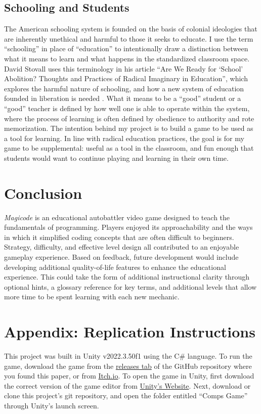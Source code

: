 \documentclass[10pt,twocolumn]{article}
\begin{document}
\subsection{Schooling and Students}
The American schooling system is founded on the basis of colonial ideologies that are inherently unethical and harmful to those it seeks to educate. I use the term “schooling” in place of “education” to intentionally draw a distinction between what it means to learn and what happens in the standardized classroom space. David Stovall uses this terminology in his article “Are We Ready for ‘School’ Abolition? Thoughts and Practices of Radical Imaginary in Education”, which explores the harmful nature of schooling, and how a new system of education founded in liberation is needed \cite{stovall-abolition}. What it means to be a “good” student or a “good” teacher is defined by how well one is able to operate within the system, where the process of learning is often defined by obedience to authority and rote memorization. The intention behind my project is to build a game to be used as a tool for learning. In line with radical education practices, the goal is for my game to be supplemental: useful as a tool in the classroom, and fun enough that students would want to continue playing and learning in their own time.


\section{Conclusion}
\textit{Magicode} is an educational autobattler video game designed to teach the fundamentals of programming. Players enjoyed its approachability and the ways in which it simplified coding concepts that are often difficult to beginners. Strategy, difficulty, and effective level design all contributed to an enjoyable gameplay experience. Based on feedback, future development would include developing additional quality-of-life features to enhance the educational experience. This could take the form of additional instructional clarity through optional hints, a glossary reference for key terms, and additional levels that allow more time to be spent learning with each new mechanic.

\appendix

\section{Appendix: Replication Instructions}
This project was built in Unity v2022.3.50f1 using the C\# language. To run the game, download the game from the \href{https://github.com/slevy14/Comps-Game/releases/tag/Release}{releases tab} of the GitHub repository where you found this paper, or from \href{https://leafguy.itch.io/magicode}{Itch.io}. To open the game in Unity, first download the correct version of the game editor from \href{https://unity.com/releases/2022-lts}{Unity's Website}. Next, download or clone this project's git repository, and open the folder entitled ``Comps Game'' through Unity's launch screen.
\end{document}
